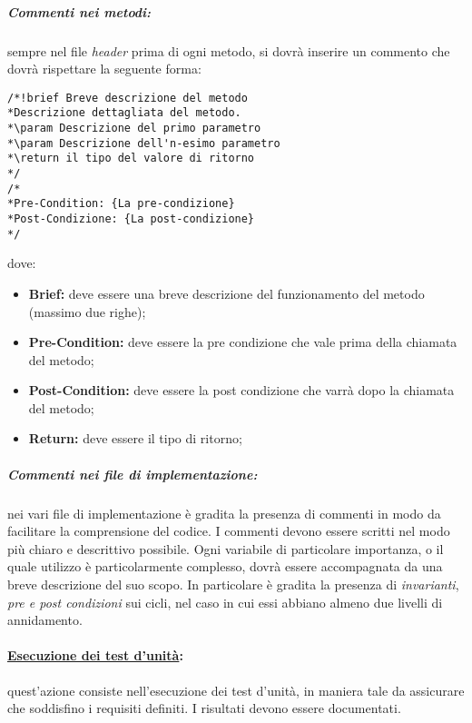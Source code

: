 \subparagraph{Commenti nei metodi:}
\label{commenti}
sempre nel file \textit{header} prima di ogni metodo, si dovrà inserire un commento che dovrà rispettare la seguente forma:
\begin{verbatim}
/*!brief Breve descrizione del metodo
*Descrizione dettagliata del metodo.
*\param Descrizione del primo parametro
*\param Descrizione dell'n-esimo parametro
*\return il tipo del valore di ritorno
*/
/*
*Pre-Condition: {La pre-condizione}
*Post-Condizione: {La post-condizione}
*/
\end{verbatim}
dove:
\begin{itemize}
\item\textbf{Brief:} deve essere una breve descrizione del funzionamento del metodo (massimo due righe);
\item\textbf{Pre-Condition:} deve essere la pre condizione che vale prima della chiamata del metodo;
\item\textbf{Post-Condition:} deve essere la post condizione che varrà dopo la chiamata del metodo;
\item\textbf{Return:} deve essere il tipo di ritorno;
\end{itemize}

\subparagraph{Commenti nei file di implementazione:}
\label{implementazione}
nei vari file di implementazione è gradita la presenza di commenti in modo da facilitare la comprensione del codice. I commenti devono essere scritti nel modo più chiaro e descrittivo possibile. Ogni variabile di particolare importanza, o il quale utilizzo è particolarmente complesso, dovrà essere accompagnata da una breve descrizione del suo scopo. In particolare è gradita la presenza di \textit{invarianti}, \textit{pre e post condizioni} sui cicli, nel caso in cui essi abbiano almeno due livelli di annidamento.

\paragraph{\underline{Esecuzione dei test d'unità}:} quest'azione consiste nell'esecuzione dei test d'unità, in maniera tale da assicurare che soddisfino i requisiti definiti. I risultati devono essere documentati.




